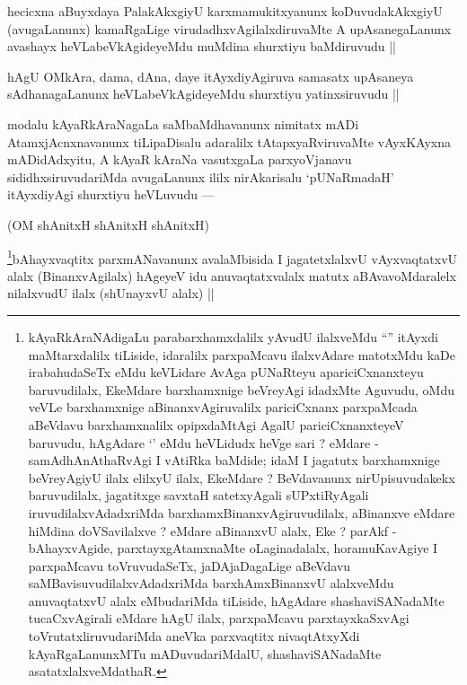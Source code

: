 \begin{artha}
hecicxna aBuyxdaya PalakAkxgiyU karxmamukitxyanunx koDuvudakAkxgiyU (avugaLanunx) kamaRgaLige virudadhxvAgilalxdiruvaMte A upAsanegaLanunx avashayx heVLabeVkAgideyeMdu muMdina shurxtiyu baMdiruvudu ||
\end{artha}



\begin{artha}
hAgU OMkAra, dama, dAna, daye itAyxdiyAgiruva samasatx upAsaneya sAdhanagaLanunx heVLabeVkAgideyeMdu shurxtiyu yatinxsiruvudu ||
\end{artha}


\begin{artha}
modalu kAyaRkAraNagaLa saMbaMdhavanunx nimitatx mADi AtamxjAcnxnavanunx tiLipaDisalu adaralilx tAtapxyaRviruvaMte vAyxKAyxna mADidAdxyitu, A kAyaR kAraNa vasutxgaLa parxyoVjanavu sididhxsiruvudariMda avugaLanunx ililx nirAkarisalu `pUNaRmadaH' itAyxdiyAgi shurxtiyu heVLuvudu ---
\end{artha}

\begin{center}
(OM shAnitxH shAnitxH shAnitxH)
\end{center}


\begin{artha}
\footnote{kAyaRkAraNAdigaLu parabarxhamxdalilx yAvudU ilalxveMdu ``\stext'' itAyxdi maMtarxdalilx tiLiside, idaralilx parxpaMcavu ilalxvAdare matotxMdu kaDe irabahudaSeTx eMdu keVLidare AvAga pUNaRteyu apariciCxnanxteyu baruvudilalx, EkeMdare barxhamxnige beVreyAgi idadxMte Aguvudu, oMdu veVLe barxhamxnige aBinanxvAgiruvalilx pariciCxnanx parxpaMcada aBeVdavu barxhamxnalilx opipxdaMtAgi AgalU pariciCxnanxteyeV baruvudu, hAgAdare `\stext' eMdu heVLidudx heVge sari ? eMdare - samAdhAnAthaRvAgi I vAtiRka baMdide; idaM I jagatutx barxhamxnige beVreyAgiyU ilalx elilxyU ilalx, EkeMdare ? BeVdavanunx nirUpisuvudakekx baruvudilalx, jagatitxge savxtaH satetxyAgali sUPxtiRyAgali iruvudilalxvAdadxriMda barxhamxBinanxvAgiruvudilalx, aBinanxve eMdare hiMdina doVSavilalxve ? eMdare aBinanxvU alalx, Eke ? parAkf - bAhayxvAgide, parxtayxgAtamxnaMte oLaginadalalx, horamuKavAgiye I parxpaMcavu toVruvudaSeTx, jaDAjaDagaLige aBeVdavu saMBavisuvudilalxvAdadxriMda barxhAmxBinanxvU alalxveMdu anuvaqtatxvU alalx eMbudariMda tiLiside, hAgAdare shashaviSANadaMte tucaCxvAgirali eMdare hAgU ilalx, parxpaMcavu parxtayxkaSxvAgi toVrutatxliruvudariMda aneVka parxvaqtitx nivaqtAtxyXdi kAyaRgaLanunxMTu mADuvudariMdalU, shashaviSANadaMte asatatxlalxveMdathaR.}bAhayxvaqtitx parxmANavanunx avalaMbisida I jagatetxlalxvU vAyxvaqtatxvU alalx (BinanxvAgilalx) hAgeyeV idu anuvaqtatxvalalx matutx aBAvavoMdaralelx nilalxvudU ilalx (shUnayxvU alalx) ||
\end{artha}

